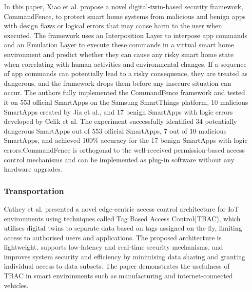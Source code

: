 In\cite{xiaoCommandFenceNovelDigitalTwinBased2022} this paper,  Xiao et al. propose a novel digital-twin-based security framework, CommandFence, to protect smart home systems from malicious and benign apps with design flaws or logical errors that may cause harm to the user when executed. The framework uses an Interposition Layer to interpose app commands and an Emulation Layer to execute these commands in a virtual smart home environment and predict whether they can cause any risky smart home state when correlating with human activities and environmental changes. If a sequence of app commands can potentially lead to a risky consequence, they are treated as dangerous, and the framework drops them before any insecure situation can occur. The authors fully implemented the CommandFence framework and tested it on 553 official SmartApps on the Samsung SmartThings platform, 10 malicious SmartApps created by Jia et al., and 17 benign SmartApps with logic errors developed by Celik et al. The experiment successfully identified 34 potentially dangerous SmartApps out of 553 official SmartApps, 7 out of 10 malicious SmartApps, and achieved 100\% accuracy for the 17 benign SmartApps with logic errors.CommandFence is orthogonal to the well-received permission-based access control mechanisms and can be implemented as plug-in software without any hardware upgrades. 

\subsubsection*{Transportation}

Cathey et al.\cite{glenandbensonjamesandguptamaanakandsandhuravicatheyEdgeCentricSecure2021} presented a novel edge-centric access control architecture for IoT environments using techniques called Tag Based Access Control(TBAC), which utilises digital twins to separate data based on tags assigned on the fly, limiting access to authorised users and applications. The proposed architecture is lightweight, supports low-latency and real-time security mechanisms, and improves system security and efficiency by minimising data sharing and granting individual access to data subsets. The paper demonstrates the usefulness of TBAC in smart environments such as manufacturing and internet-connected vehicles.

